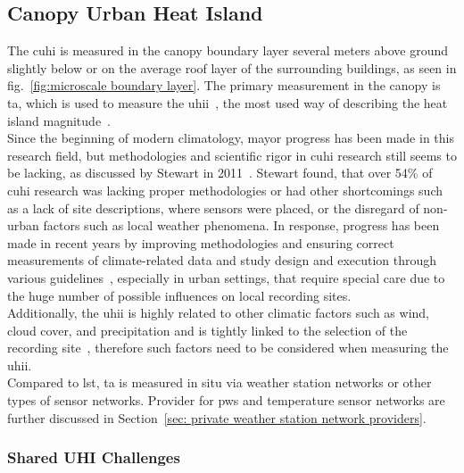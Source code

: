 \subsection{Canopy Urban Heat Island}

The \gls{cuhi} is measured in the canopy boundary layer several meters above ground slightly below or on the average roof layer of the surrounding buildings, as seen in fig.~\ref{fig:microscale boundary layer}. The primary measurement in the canopy is \gls{ta}, which is used to measure the \gls{uhii}~\cite{oke1973city}, the most used way of describing the heat island magnitude~\cite{kim2021urban}.\\
Since the beginning of modern climatology, mayor progress has been made in this research field, but methodologies and scientific rigor in \gls{cuhi} research still seems to be lacking, as discussed by Stewart in 2011~\cite{stewart2011systematic}. Stewart found, that over 54\% of \gls{cuhi} research was lacking proper methodologies or had other shortcomings such as a lack of site descriptions, where sensors were placed, or the disregard of non-urban factors such as local weather phenomena. In response, progress has been made in recent years by improving methodologies and ensuring correct measurements of climate-related data and study design and execution through various guidelines~\cite{oke2006guideline}, especially in urban settings, that require special care due to the huge number of possible influences on local recording sites.\\
Additionally, the \gls{uhii} is highly related to other climatic factors such as wind, cloud cover, and precipitation and is tightly linked to the selection of the recording site~\cite{fenner2019contrasting}, therefore such factors need to be considered when measuring the \gls{uhii}.\\
Compared to \gls{lst}, \gls{ta} is measured in situ via weather station networks or other types of sensor networks. Provider for \gls{pws} and temperature sensor networks are further discussed in Section~\ref{sec: private weather station network providers}.

\subsubsection{Shared UHI Challenges}

